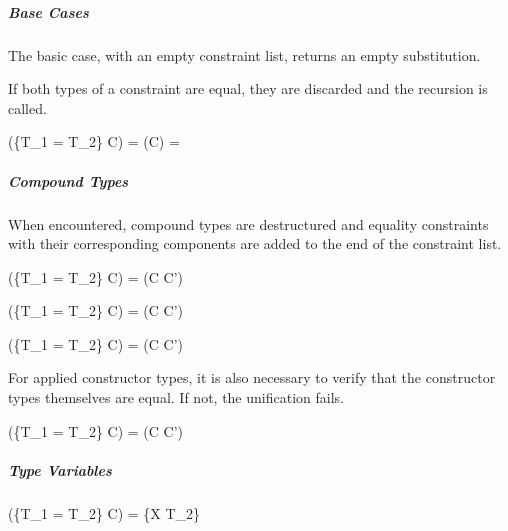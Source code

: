 \documentclass[class=article, crop=false]{standalone}
\begin{document}
\subparagraph{Base Cases}

The basic case, with an empty constraint list, returns an empty substitution.


If both types of a constraint are equal, they are discarded and the recursion is called.

  {\gamma \vdash {}(\{T_1 = T_2\} \cup C) = \gamma \vdash {}(C) = \sigma}

\subparagraph{Compound Types}

When encountered, compound types are destructured and equality constraints with their corresponding components are added to the end of the constraint list.

  {\gamma \vdash {}(\{T_1 = T_2\} \cup C) = \gamma \vdash {}(C \cup C')}

  {\gamma \vdash {}(\{T_1 = T_2\} \cup C) = \gamma \vdash {}(C \cup C')}

  {\gamma \vdash {}(\{T_1 = T_2\} \cup C) = \gamma \vdash {}(C \cup C')}

For applied constructor types, it is also necessary to verify that the constructor types themselves are equal.
If not, the unification fails.

  {\gamma \vdash {}(\{T_1 = T_2\} \cup C) = \gamma \vdash {}(C \cup C')}

\subparagraph{Type Variables}

  {\gamma \vdash {}(\{T_1 = T_2\} \cup C) = \{X \rightarrow T_2\} \cup \sigma}
\end{document}
